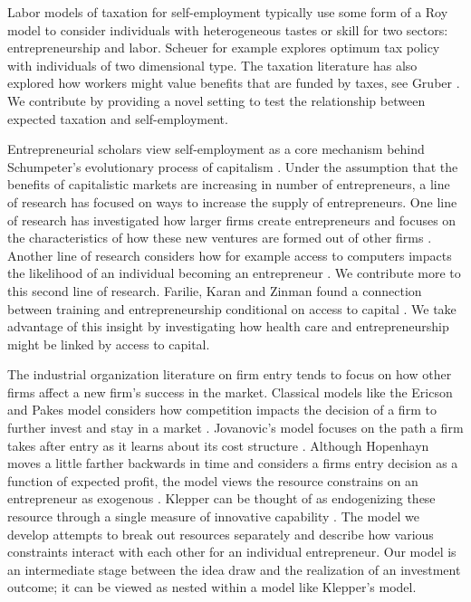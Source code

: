 \documentclass[12pt]{article}
\begin{document}
Labor models of taxation for self-employment typically use some form of a Roy model \cite{roy} to consider individuals with heterogeneous tastes or skill for two sectors: entrepreneurship and labor. Scheuer \cite{scheuer} for example explores optimum tax policy with individuals of two dimensional type. The taxation literature has also explored how workers might value benefits that are funded by taxes, see Gruber \cite{gruber1997}. We contribute by providing a novel setting to test the relationship between expected taxation and self-employment. 

Entrepreneurial scholars view self-employment as a core mechanism behind Schumpeter's evolutionary process of capitalism \cite{schumpeter}. Under the assumption that the benefits of capitalistic markets are increasing in number of entrepreneurs, a line of research has focused on ways to increase the supply of entrepreneurs. One line of research has investigated how larger firms create entrepreneurs and focuses on the characteristics of how these new ventures are formed out of other firms\cite{burton} \cite{gompers}. Another line of research considers how for example access to computers impacts the likelihood of an individual becoming an entrepreneur \cite{fairlie}. We contribute more to this second line of research. Farilie, Karan and Zinman found a connection between training and entrepreneurship conditional on access to capital \cite{fairlieKarlanZinman}. We take advantage of this insight by investigating how health care and entrepreneurship might be linked by access to capital. 

The industrial organization literature on firm entry tends to focus on how other firms affect a new firm's success in the market. Classical models like the Ericson and Pakes model considers how competition impacts the decision of a firm to further invest and stay in a market \cite{ericsonPakes}. Jovanovic's model  focuses on the path a firm takes after entry as it learns about its cost structure \cite{jovanovic}. Although Hopenhayn moves a little farther backwards in time and considers a firms entry decision as a function of expected profit, the model views the resource constrains on an entrepreneur as exogenous \cite{hopenhayn}. Klepper can be thought of as endogenizing these resource through a single measure of innovative capability \cite{klepper}. The model we develop attempts to break out resources separately and describe how various constraints interact with each other for an individual entrepreneur. Our model is an intermediate stage between the idea draw and the realization of an investment outcome; it can be viewed as nested within a model like Klepper's model. 
\end{document}
